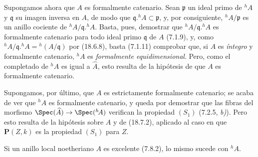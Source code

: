 Supongamos ahora que $A$ es formalmente catenario. Sean $\mathfrak p$ un ideal primo de ${}^h\!A$ y $\mathfrak q$ su imagen inversa en $A$, de modo que $\mathfrak q.{}^h\!A\subset\mathfrak p$, y, por consiguiente, ${}^h\!A/\mathfrak p$ es un anillo cociente de ${}^h\!A/\mathfrak q.{}^h\!A$. Basta, pues, demostrar que ${}^h\!A/\mathfrak q.{}^h\!A$ es formalmente catenario para todo ideal primo $\mathfrak q$ de $A$ (7.1.9), y, como ${}^h\!A/\mathfrak q.{}^h\!A={}^h(A/\mathfrak q)$ por (18.6.8), basta (7.1.11) comprobar que, si $A$ es \emph{íntegro} y formalmente catenario, ${}^h\!A$ es \emph{formalmente equidimensional}. Pero, como el completado de ${}^h\!A$ es igual a $\widehat A$, esto resulta de la hipótesis de que $A$ es formalmente catenario.


Supongamos, por último, que $A$ es estrictamente formalmente catenario; se acaba de ver que ${}^h\!A$ es formalmente catenario, y queda por demostrar que las fibras del morfismo $\Spec(\widehat A)\to\Spec({}^h\!A)$ verifican la propiedad $(S_1)$ (7.2.5, \emph{b)}). Pero esto resulta de la hipótesis sobre $A$ y de (18.7.2), aplicado al caso en que $\boldsymbol{P}(Z,k)$ es la propiedad $(S_1)$ para $Z$.

\begin{corollary}[18.7.6]
\label{IV.18.7.6}
Si un anillo local noetheriano $A$ es excelente \textup{(7.8.2)}, lo mismo sucede con ${}^h\!A$.
\end{corollary}

